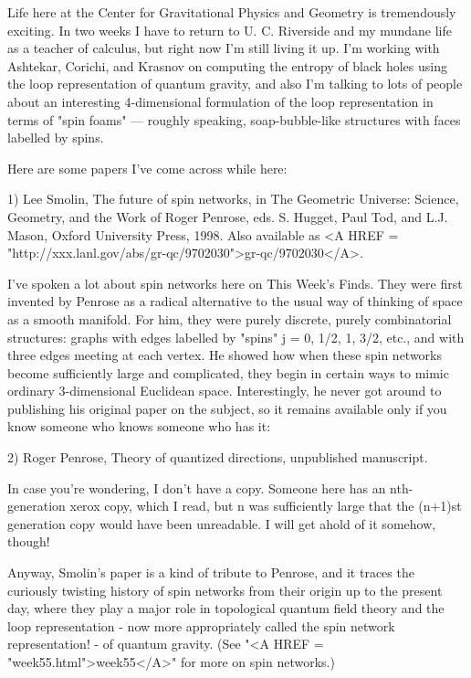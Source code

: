 


Life here at the Center for Gravitational Physics and Geometry is
tremendously exciting.  In two weeks I have to return to U. C.
Riverside and my mundane life as a teacher of calculus, but right now
I'm still living it up.  I'm working with Ashtekar, Corichi, and
Krasnov on computing the entropy of black holes using the loop
representation of quantum gravity, and also I'm talking to lots of
people about an interesting 4-dimensional formulation of the loop
representation in terms of "spin foams" --- roughly speaking,
soap-bubble-like structures with faces labelled by spins.

Here are some papers I've come across while here:

1) Lee Smolin, The future of spin networks, in
The Geometric Universe: Science, Geometry, and the Work of Roger
Penrose, eds. S. Hugget, Paul Tod, and L.J. Mason, Oxford University
Press, 1998.  Also available as
<A HREF = "http://xxx.lanl.gov/abs/gr-qc/9702030">gr-qc/9702030</A>.

I've spoken a lot about spin networks here on This Week's Finds.  They
were first invented by Penrose as a radical alternative to the usual
way of thinking of space as a smooth manifold.  For him, they were
purely discrete, purely combinatorial structures: graphs with edges
labelled by "spins" j = 0, 1/2, 1, 3/2, etc., and with three edges
meeting at each vertex.  He showed how when these spin networks become
sufficiently large and complicated, they begin in certain ways to
mimic ordinary 3-dimensional Euclidean space.  Interestingly, he never
got around to publishing his original paper on the subject, so it
remains available only if you know someone who knows someone who has it:

2) Roger Penrose, Theory of quantized directions, unpublished manuscript.

In case you're wondering, I don't have a copy.  Someone here has
an nth-generation xerox copy, which I read, but n was sufficiently large
that the (n+1)st generation copy would have been unreadable.  I will
get ahold of it somehow, though!  

Anyway, Smolin's paper is a kind of tribute to Penrose, and it traces
the curiously twisting history of spin networks from their origin up
to the present day, where they play a major role in topological
quantum field theory and the loop representation - now more
appropriately called the spin network representation! - of quantum
gravity.  (See "<A HREF = "week55.html">week55</A>" for more
on spin networks.)

